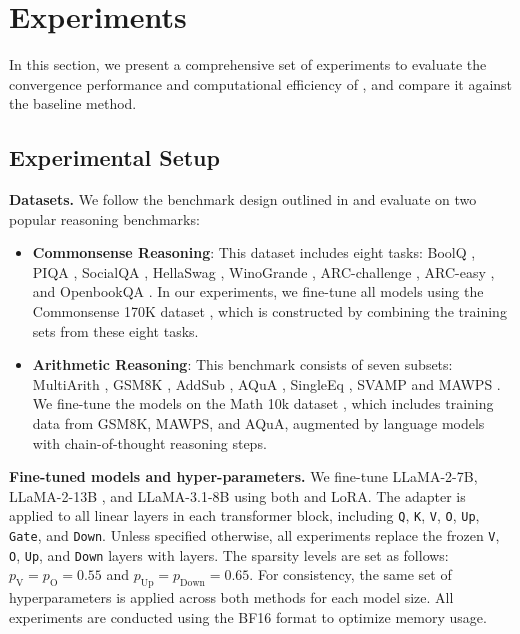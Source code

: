 \section{Experiments}

In this section, we present a comprehensive set of experiments to evaluate the convergence performance and computational efficiency of \celora, and compare it against the baseline method.


\subsection{Experimental Setup}

\textbf{Datasets.}
We follow the benchmark design outlined in \cite{hu2023llm} and evaluate \celora on two popular reasoning benchmarks:

\begin{itemize}[topsep=5pt, leftmargin=1em]
\vspace{-0.5em}
\item \textbf{Commonsense Reasoning}: This dataset includes eight tasks: BoolQ \cite{clark-etal-2019-boolq}, PIQA \cite{bisk2020piqa}, SocialQA \cite{sap2019socialiqa}, HellaSwag \cite{zellers2019hellaswag}, WinoGrande \cite{sakaguchi2021winogrande}, ARC-challenge \cite{clark2018think}, ARC-easy \cite{clark2018think}, and OpenbookQA \cite{mihaylov2018can}. In our experiments, we fine-tune all models using the Commonsense 170K dataset \cite{hu2023llm}, which is constructed by combining the training sets from these eight tasks.

\vspace{-0.5em}
\item \textbf{Arithmetic Reasoning}:
This benchmark consists of seven subsets: MultiArith \cite{roy2016solving}, GSM8K \cite{cobbe2021training}, AddSub \cite{hosseini2014learning}, AQuA \cite{ling-etal-2017-program}, SingleEq \cite{koncel-kedziorski-etal-2015-parsing}, SVAMP \cite{patel-etal-2021-nlp} and MAWPS \cite{koncel-kedziorski-etal-2016-mawps}.
We fine-tune the models on the Math 10k dataset \cite{hu2023llm}, which includes training data from GSM8K, MAWPS, and AQuA, augmented by language models with chain-of-thought reasoning steps.
\vspace{-0.5em}
\end{itemize}

\textbf{Fine-tuned models and hyper-parameters.} We fine-tune LLaMA-2-7B, LLaMA-2-13B \cite{touvron2023llama2openfoundation}, and LLaMA-3.1-8B \cite{llama3modelcard} using both \celora and LoRA.
% 
The adapter is applied to all linear layers in each transformer block, including \texttt{Q}, \texttt{K}, \texttt{V}, \texttt{O}, \texttt{Up}, \texttt{Gate}, and \texttt{Down}.
% 
Unless specified otherwise, all \celora experiments replace the frozen \texttt{V}, \texttt{O}, \texttt{Up}, and \texttt{Down} layers with \celora layers.
% 
The sparsity levels are set as follows: $p_\text{V} = p_\text{O} = 0.55$ and $p_\text{Up} = p_\text{Down} = 0.65$. 
% 
For consistency, the same set of hyperparameters is applied across both methods for each model size.
% 
All experiments are conducted using the BF16 format to optimize memory usage.
% 

